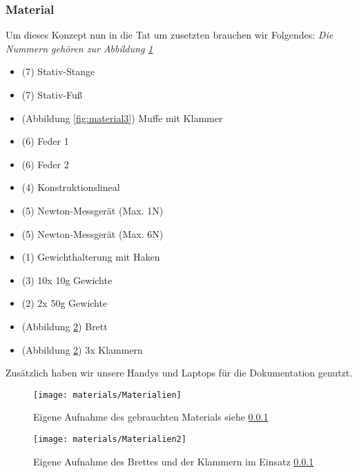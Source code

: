 \documentclass[../main.tex]{subfiles} %
\begin{document}
        \subsubsection{Material}\label{subsubsec:material}

            Um dieses Konzept nun in die Tat um zusetzten brauchen wir Folgendes:
            \textit{Die Nummern gehören zur Abbildung \ref{fig:material}}
            \begin{itemize}
                \item (7) Stativ-Stange
                \item (7) Stativ-Fuß
                \item (Abbildung \ref{fig:material3}) Muffe mit Klammer
                \item (6) Feder 1
                \item (6) Feder 2
                \item (4) Konstruktionslineal
                \item (5) Newton-Messgerät (Max. 1N)
                \item (5) Newton-Messgerät (Max. 6N)
                \item (1) Gewichthalterung mit Haken
                \item (3) 10x 10g Gewichte
                \item (2) 2x 50g Gewichte
                \item (Abbildung \ref{fig:material2}) Brett
                \item (Abbildung \ref{fig:material2}) 3x Klammern
            \end{itemize}
            \noindent
            Zusätzlich haben wir unsere Handys und Laptops für die Dokumentation genutzt.

            \begin{figure}[H]
                \centering
                \texttt{[image: materials/Materialien]}
                \caption{Eigene Aufnahme des gebrauchten Materials siehe \ref{subsubsec:material}}
                \label{fig:material}
            \end{figure}

            \begin{figure}[H]
                \centering
                \texttt{[image: materials/Materialien2]}
                \caption{Eigene Aufnahme des Brettes und der Klammern im Einsatz \ref{subsubsec:material}}
                \label{fig:material2}
            \end{figure}
\end{document}
